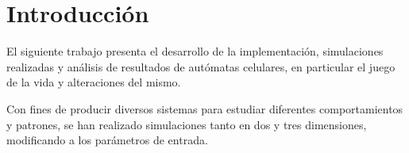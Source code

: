 \section{Introducción}\label{sec:introduccion}
El siguiente trabajo presenta el desarrollo de la implementación, simulaciones realizadas y análisis de resultados de
autómatas celulares, en particular el juego de la vida y alteraciones del mismo.

Con fines de producir diversos sistemas para estudiar diferentes comportamientos y patrones, se han realizado
simulaciones tanto en dos y tres dimensiones, modificando a los parámetros de entrada.